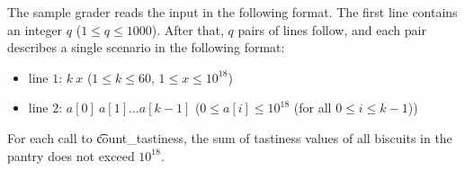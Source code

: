 The sample grader reads the input in the following format. The first line contains an integer $q$ ($1 \leq q \leq 1000$).
After that, $q$ pairs of lines follow, and each pair describes a single scenario in the following format:
\begin{itemize}
\item line $1$: $k\ x$ ($1 \leq k \leq 60$, $1 \leq x \leq 10^{18}$)
\item line $2$: $a[0]\ a[1]\ldots a[k-1]$ ($0 \leq a[i] \leq 10^{18}$ (for all $0 \leq i \leq k-1$))
\end{itemize}

For each call to \t{count\_tastiness}, the sum of tastiness values of all biscuits in the pantry does not exceed $10^{18}$.